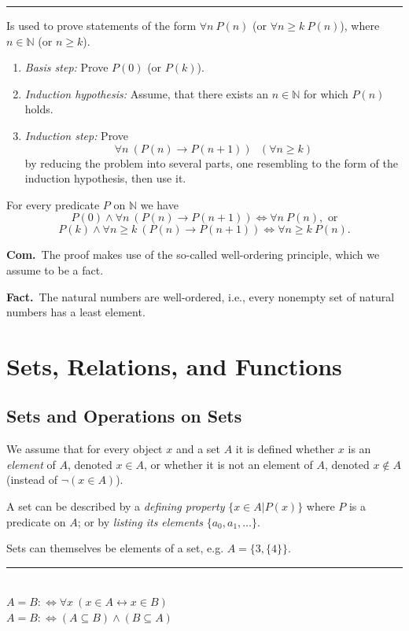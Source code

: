 \documentclass[a4paper]{extarticle}
\newcommand{\Fact}{\textbf{Fact.}\ }
\newcommand{\Com}{\textbf{Com.}\ }
\newcommand{\N}{\mathbb{N}}
\newcommand{\sep}{\vspace{5pt}\noindent\hrule\vspace{5pt}}
\begin{document}
\begin{multicols*}{2}
\sep
{}
Is used to prove statements of the form $\forall n \ P(n)$ (or $\forall n\geq k
\ P(n)$), where $n\in \N$ (or $n\geq k$).
\begin{enumerate}
  \item \emph{Basis step:} Prove $P(0)$ (or $P(k)$).
  \item \emph{Induction hypothesis:} Assume, that there exists an $n\in \N$ for
  which $P(n)$ holds.
  \item \emph{Induction step:} Prove
  \[\forall n \ (P(n)\rightarrow
  P(n+1)) \ \ \ (\forall n \geq k)\] by reducing the problem into several parts,
  one resembling to the form of the induction hypothesis, then use it.
\end{enumerate}

\Thm For every predicate $P$ on $\N$ we have
\[
P(0) \land \forall n \ (P(n)\to P(n+1)) \Longleftrightarrow \forall n \ P(n),
\text{ or}
\]
\[
P(k) \land \forall n\geq k \ (P(n)\to P(n+1)) \Longleftrightarrow \forall n\geq
k \ P(n).
\]

\Com The proof makes use of the so-called well-ordering principle, which we
assume to be a fact.

\Fact The natural numbers are well-ordered, i.e., every nonempty set of
natural numbers has a least element.

\section{Sets, Relations, and Functions}

\subsection{Sets and Operations on Sets}

We assume that for every object $x$ and a set $A$ it is defined whether $x$ is
an \emph{element} of $A$, denoted $x\in A$, or whether it is not an element of
$A$, denoted $x\not\in A$ (instead of $\lnot (x\in A)$).

A set can be described by a \emph{defining property} $\{x\in A| P(x)\}$ where
$P$ is a predicate on $A$; or by \emph{listing its elements} $\{a_0, a_1,
\ldots\}$.

Sets can themselves be elements of a set, e.g. $A=\{3,\{4\}\}$.

\sep

\\ 
$A=B:\Longleftrightarrow\forall x \ (x\in A
\leftrightarrow x \in B)$
\\
$A=B:\Longleftrightarrow (A \subseteq B) \land (B\subseteq A)$


\end{multicols*}
\end{document}

